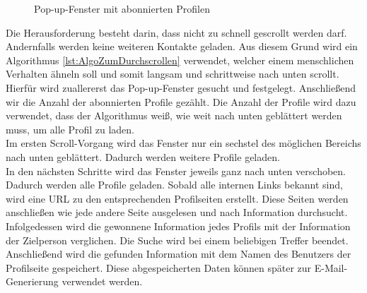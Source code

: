 	\begin{figure}[H]
		\centering
		\caption{Pop-up-Fenster mit abonnierten Profilen}
		\label{img:instagram_abonniert}
	\end{figure}
	
	Die Herausforderung besteht darin, dass nicht zu schnell gescrollt werden darf. Andernfalls werden keine weiteren Kontakte geladen. Aus diesem Grund wird ein Algorithmus \ref{lst:AlgoZumDurchscrollen} verwendet, welcher einem menschlichen Verhalten ähneln soll und somit langsam und schrittweise nach unten scrollt. Hierfür wird zuallererst das Pop-up-Fenster gesucht und festgelegt. Anschließend wir die Anzahl der abonnierten Profile gezählt. Die Anzahl der Profile wird dazu verwendet, dass der Algorithmus weiß, wie weit nach unten geblättert werden muss, um alle Profil zu laden.\\
	Im ersten Scroll-Vorgang wird das Fenster nur ein sechstel des möglichen Bereichs nach unten geblättert. Dadurch werden weitere Profile geladen.\\
	In den nächsten Schritte wird das Fenster jeweils ganz nach unten verschoben. Dadurch werden alle Profile geladen. Sobald alle internen Links bekannt sind, wird eine URL zu den entsprechenden Profilseiten erstellt. Diese Seiten werden anschließen wie jede andere Seite ausgelesen und nach Information durchsucht. Infolgedessen wird die gewonnene Information jedes Profils mit der Information der Zielperson verglichen. Die Suche wird bei einem beliebigen Treffer beendet. Anschließend wird die gefunden Information mit dem Namen des Benutzers der Profilseite gespeichert. Diese abgespeicherten Daten können später zur E-Mail-Generierung verwendet werden.\\
	
